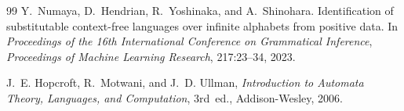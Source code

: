 \documentclass[11pt,a4paper]{article}
\begin{document}
\begin{thebibliography}{99}
Y.~Numaya, D.~Hendrian, R.~Yoshinaka, and A.~Shinohara.
Identification of substitutable context-free languages over infinite
alphabets from positive data.
In \textit{Proceedings of the 16th International Conference on
Grammatical Inference},
\textit{Proceedings of Machine Learning Research},
217:23--34, 2023.

J.~E. Hopcroft, R.~Motwani, and J.~D. Ullman,
\textit{Introduction to Automata Theory, Languages, and Computation},
3rd~ed., Addison-Wesley, 2006.


\end{thebibliography}
\end{document}
